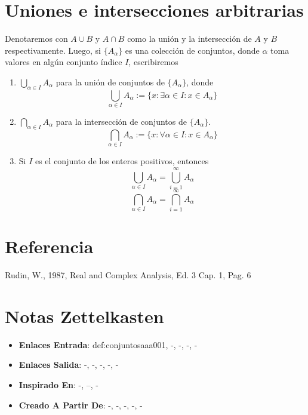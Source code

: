 \documentclass[12pt]{article}
\begin{document}
\section*{Uniones e intersecciones arbitrarias}

\begin{definition}
Denotaremos  con $ A \cup B$   y $A \cap B$ como la unión y la intersección de $A$ y $B$ respectivamente. Luego, si $\{ A_{\alpha}\}$ es una colección de conjuntos, donde $\alpha$ toma valores en algún conjunto índice $I$, escribiremos
\begin{enumerate}
\item $\bigcup_{\alpha \in I} A_{\alpha}$ para la unión de conjuntos de $\{ A_{\alpha}\}$, donde
\[ \bigcup_{\alpha \in I} A_{\alpha} := \{ x :\exists \alpha \in I: x \in A_{\alpha} \} \]
\item $\bigcap_{\alpha \in I} A_{\alpha}$ para la intersección de conjuntos de $\{ A_{\alpha}\}$.
\[ \bigcap_{\alpha \in I} A_{\alpha} := \{ x :\forall \alpha \in I: x \in A_{\alpha} \} \]
\item  Si $I$ es el conjunto de los enteros positivos, entonces
\[ \bigcup_{\alpha \in I} A_{\alpha} = \bigcup_{i=1}^{\infty} A_{\alpha} \]
\[ \bigcap_{\alpha \in I} A_{\alpha} = \bigcap_{i=1}^{\infty} A_{\alpha} \]
\end{enumerate}
\end{definition}

\section*{Referencia}
Rudin, W., 1987, Real and Complex Analysis, Ed. 3 Cap. 1, Pag. 6 

\section*{Notas Zettelkasten}
\begin{itemize}
  \item \textbf{Enlaces Entrada}: def:conjuntosaaa001, -, -, -, -
  \item \textbf{Enlaces Salida}: -, -, -, -, -
  \item \textbf{Inspirado En}: -, --, -
  \item \textbf{Creado A Partir De}: -, -, -, -, -
\end{itemize}
\end{document}
